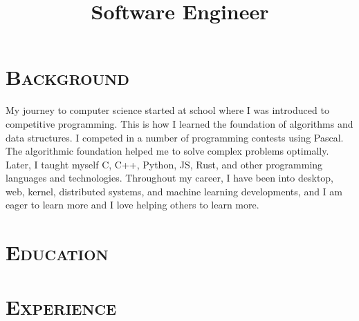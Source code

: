 \documentclass[11pt,a4paper,sans]{moderncv}   %
\title{Software Engineer}               %
\begin{document}
\maketitle
\vspace*{-2em}

\section{\textsc{Background}}

My journey to computer science started at school where I was introduced to
competitive programming. This is how I learned the foundation of algorithms and data
structures. I competed in a number of programming contests using Pascal. The
algorithmic foundation helped me to solve complex problems optimally. Later, I
taught myself C, C++, Python, JS, Rust, and other programming languages and
technologies. Throughout my career, I have been into desktop, web, kernel,
distributed systems, and machine learning developments, and I am eager to learn
more and I love helping others to learn more.

\vspace*{1em}
\section{\textsc{Education}}

\vspace*{1em}
\section{\textsc{Experience}}

\end{document}
